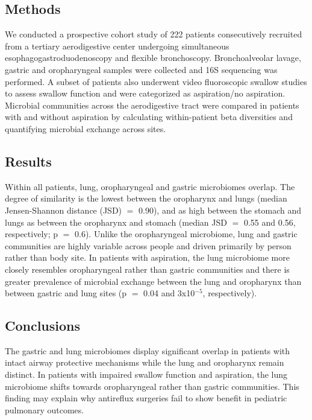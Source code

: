 \documentclass{article}
\begin{document}
\subsection{Methods} 

We conducted a prospective cohort study of 222 patients consecutively recruited from a tertiary aerodigestive center undergoing simultaneous esophagogastroduodenoscopy and flexible bronchoscopy. 
Bronchoalveolar lavage, gastric and oropharyngeal samples were collected and 16S sequencing was performed. 
A subset of patients also underwent video fluoroscopic swallow studies to assess swallow function and were categorized as aspiration/no aspiration. 
Microbial communities across the aerodigestive tract were compared in patients with and without aspiration by calculating within-patient beta diversities and quantifying microbial exchange across sites.

\subsection{Results}

Within all patients, lung, oropharyngeal and gastric microbiomes overlap. 
The degree of similarity is the lowest between the oropharynx and lungs (median Jensen-Shannon distance (JSD) $=$ 0.90), and as high between the stomach and lungs as between the oropharynx and stomach (median JSD $=$ 0.55 and 0.56, respectively; p $=$ 0.6). 
Unlike the oropharyngeal microbiome, lung and gastric communities are highly variable across people and driven primarily by person rather than body site. 
In patients with aspiration, the lung microbiome more closely resembles oropharyngeal rather than gastric communities and there is greater prevalence of microbial exchange between the lung and oropharynx than between gastric and lung sites (p $=$ 0.04 and 3x10$^{-5}$, respectively). 

\subsection{Conclusions}

The gastric and lung microbiomes display significant overlap in patients with intact airway protective mechanisms while the lung and oropharynx remain distinct. 
In patients with impaired swallow function and aspiration, the lung microbiome shifts towards oropharyngeal rather than gastric communities. 
This finding may explain why antireflux surgeries fail to show benefit in pediatric pulmonary outcomes.
\end{document}
